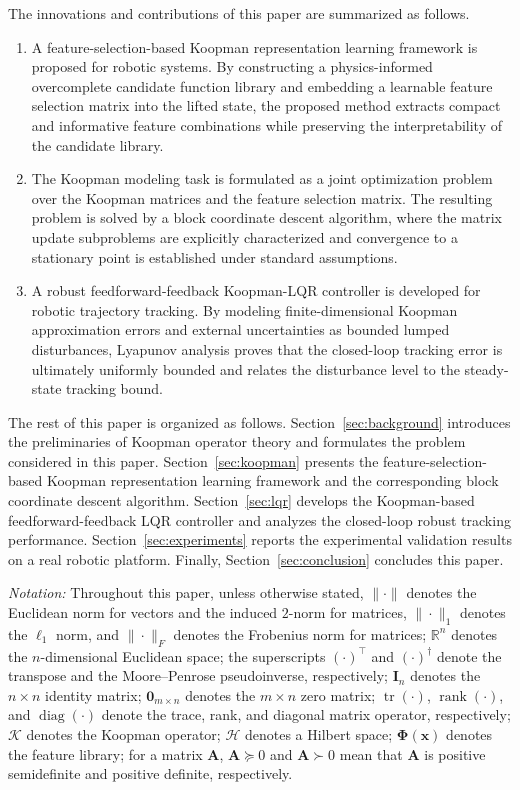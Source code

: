 \documentclass[letterpaper,10pt,conference]{ieeeconf}
\newcommand{\x}{\mathbf{x}}
\newcommand{\I}{\mathbf{I}}
\newcommand{\Phib}{\boldsymbol{\Phi}}
\DeclareMathOperator{\tr}{tr}
\DeclareMathOperator{\rank}{rank}
\DeclareMathOperator{\diag}{diag}
\begin{document}
The innovations and contributions of this paper are summarized as follows.
{\renewcommand{\labelenumi}{(\arabic{enumi})}
\begin{enumerate}
\item A feature-selection-based Koopman representation learning framework is
proposed for robotic systems. By constructing a physics-informed overcomplete
candidate function library and embedding a learnable feature selection matrix
into the lifted state, the proposed method extracts compact and informative
feature combinations while preserving the interpretability of the candidate
library.

\item The Koopman modeling task is formulated as a joint optimization problem
over the Koopman matrices and the feature selection matrix. The resulting
problem is solved by a block coordinate descent algorithm, where the matrix
update subproblems are explicitly characterized and convergence to a
stationary point is established under standard assumptions.

\item A robust feedforward-feedback Koopman-LQR controller is developed for
robotic trajectory tracking. By modeling finite-dimensional Koopman
approximation errors and external uncertainties as bounded lumped
disturbances, Lyapunov analysis proves that the closed-loop tracking error is
ultimately uniformly bounded and relates the disturbance level to the
steady-state tracking bound.
\end{enumerate}}

The rest of this paper is organized as follows. Section~\ref{sec:background}
introduces the preliminaries of Koopman operator theory and formulates the
problem considered in this paper. Section~\ref{sec:koopman} presents the
feature-selection-based Koopman representation learning framework and the
corresponding block coordinate descent algorithm. Section~\ref{sec:lqr}
develops the Koopman-based feedforward-feedback LQR controller and analyzes
the closed-loop robust tracking performance. Section~\ref{sec:experiments}
reports the experimental validation results on a real robotic platform.
Finally, Section~\ref{sec:conclusion} concludes this paper.

\textit{Notation:} Throughout this paper, unless otherwise stated,
$\|\cdot\|$ denotes the Euclidean norm for vectors and the induced $2$-norm
for matrices, $\|\cdot\|_1$ denotes the $\ell_1$ norm, and $\|\cdot\|_F$
denotes the Frobenius norm for matrices; $\mathbb{R}^n$ denotes the
$n$-dimensional Euclidean space; the superscripts $(\cdot)^\top$ and
$(\cdot)^\dagger$ denote the transpose and the Moore--Penrose pseudoinverse,
respectively; $\I_n$ denotes the $n \times n$ identity matrix;
$\mathbf{0}_{m \times n}$ denotes the $m \times n$ zero matrix;
$\tr(\cdot)$, $\rank(\cdot)$, and $\diag(\cdot)$ denote the trace, rank, and
diagonal matrix operator, respectively; $\mathcal{K}$ denotes the Koopman
operator; $\mathcal{H}$ denotes a Hilbert space; $\Phib(\x)$ denotes the
feature library; for a matrix $\mathbf{A}$, $\mathbf{A} \succeq 0$ and
$\mathbf{A} \succ 0$ mean that $\mathbf{A}$ is positive semidefinite and
positive definite, respectively.
\end{document}
